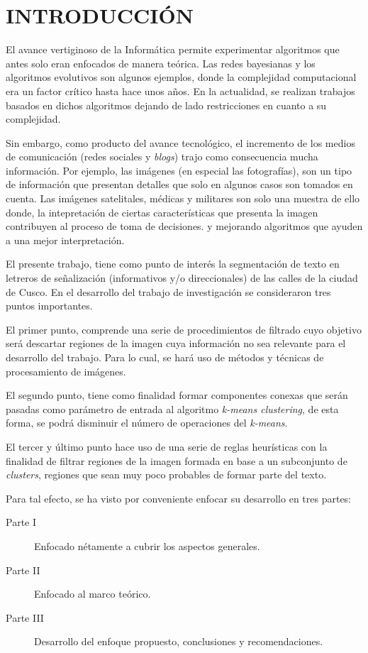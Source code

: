 \chapter*{INTRODUCCIÓN}
\label{cap:introduccion}
%

El avance vertiginoso de la Informática permite experimentar algoritmos que 
antes solo eran enfocados de manera teórica. Las redes bayesianas y los 
algoritmos evolutivos son algunos ejemplos, donde la complejidad computacional
era un factor crítico hasta hace unos años. En la actualidad, se realizan
trabajos basados en dichos algoritmos dejando de lado restricciones en cuanto a
su complejidad. 

Sin embargo, como producto del avance tecnológico, el incremento de los medios
de comunicación (redes sociales y \textit{blogs}) trajo como consecuencia mucha
información. Por ejemplo, las imágenes (en especial las fotografías), son un
tipo de información que presentan detalles que solo en algunos casos son tomados
en cuenta. Las imágenes satelitales, médicas y militares son solo una muestra de
ello donde, la intepretación de ciertas características que presenta la imagen
contribuyen al proceso de toma de decisiones.%
y mejorando algoritmos que ayuden a una mejor interpretación.

El presente trabajo, tiene como punto de interés la segmentación de texto en 
letreros de señalización (informativos y/o direccionales) de las calles de la
ciudad de Cusco. En el desarrollo del trabajo de investigación se consideraron
tres puntos importantes.

El primer punto, comprende una serie de procedimientos de filtrado cuyo objetivo
será descartar regiones de la imagen cuya información no sea relevante para el
desarrollo del trabajo. Para lo cual, se hará uso de métodos y técnicas de
procesamiento de imágenes. 

El segundo punto, tiene como finalidad formar componentes conexas que serán
pasadas como parámetro de entrada al algoritmo \textit{k-means clustering}, de
esta forma, se podrá disminuir el número de operaciones del \textit{k-means}.

El tercer y último punto hace uso de una serie de reglas heurísticas con la 
finalidad de filtrar regiones de la imagen formada en base a un subconjunto de
\textit{clusters}, regiones que sean muy poco probables de formar parte del
texto.

Para tal efecto, se ha visto por conveniente enfocar su desarrollo en tres partes:
\begin{description}
	\item[Parte I] Enfocado nétamente a cubrir los aspectos generales.
  \item[Parte II] Enfocado al marco teórico.
	\item[Parte III] Desarrollo del enfoque propuesto, conclusiones y recomendaciones.
\end{description}
